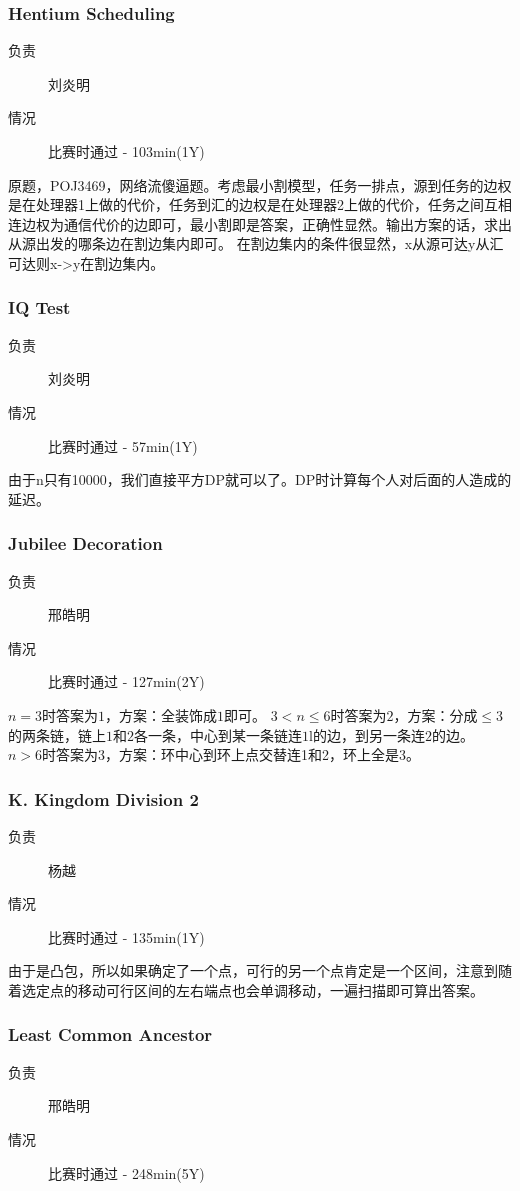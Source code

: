 \documentclass[a4paper, 11pt, nofonts, nocap, fancyhdr]{ctexart}
\newcommand{\problem}[1]{\subsubsection{#1}}
\begin{document}
\problem{Hentium Scheduling}

\begin{description}
\item[负责] 刘炎明
\item[情况] 比赛时通过 - 103min(1Y)
\end{description}

原题，POJ3469，网络流傻逼题。考虑最小割模型，任务一排点，源到任务的边权是在处理器1上做的代价，任务到汇的边权是在处理器2上做的代价，任务之间互相连边权为通信代价的边即可，最小割即是答案，正确性显然。输出方案的话，求出从源出发的哪条边在割边集内即可。
在割边集内的条件很显然，x从源可达y从汇可达则x->y在割边集内。

\problem{IQ Test}

\begin{description}
\item[负责] 刘炎明
\item[情况] 比赛时通过 - 57min(1Y)
\end{description}

由于n只有10000，我们直接平方DP就可以了。DP时计算每个人对后面的人造成的延迟。

\problem{Jubilee Decoration}

\begin{description}
\item[负责] 邢皓明
\item[情况] 比赛时通过 - 127min(2Y)
\end{description}

$n=3$时答案为$1$，方案：全装饰成$1$即可。
$3<n \leq 6$时答案为$2$，方案：分成$\leq 3$的两条链，链上$1$和$2$各一条，中心到某一条链连$1$l的边，到另一条连$2$的边。
$n > 6$时答案为3，方案：环中心到环上点交替连1和2，环上全是3。

\problem{K. Kingdom Division 2}

\begin{description}
\item[负责] 杨越
\item[情况] 比赛时通过 - 135min(1Y)
\end{description}

由于是凸包，所以如果确定了一个点，可行的另一个点肯定是一个区间，注意到随着选定点的移动可行区间的左右端点也会单调移动，一遍扫描即可算出答案。

\problem{Least Common Ancestor}

\begin{description}
\item[负责] 邢皓明
\item[情况] 比赛时通过 - 248min(5Y)
\end{description}
\end{document}
